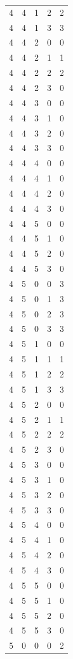 \begin{longtable}{rrrrr}
4 & 4 & 1 & 2 & 2 \\
4 & 4 & 1 & 3 & 3 \\
4 & 4 & 2 & 0 & 0 \\
4 & 4 & 2 & 1 & 1 \\
4 & 4 & 2 & 2 & 2 \\
4 & 4 & 2 & 3 & 0 \\
4 & 4 & 3 & 0 & 0 \\
4 & 4 & 3 & 1 & 0 \\
4 & 4 & 3 & 2 & 0 \\
4 & 4 & 3 & 3 & 0 \\
4 & 4 & 4 & 0 & 0 \\
4 & 4 & 4 & 1 & 0 \\
4 & 4 & 4 & 2 & 0 \\
4 & 4 & 4 & 3 & 0 \\
4 & 4 & 5 & 0 & 0 \\
4 & 4 & 5 & 1 & 0 \\
4 & 4 & 5 & 2 & 0 \\
4 & 4 & 5 & 3 & 0 \\
4 & 5 & 0 & 0 & 3 \\
4 & 5 & 0 & 1 & 3 \\
4 & 5 & 0 & 2 & 3 \\
4 & 5 & 0 & 3 & 3 \\
4 & 5 & 1 & 0 & 0 \\
4 & 5 & 1 & 1 & 1 \\
4 & 5 & 1 & 2 & 2 \\
4 & 5 & 1 & 3 & 3 \\
4 & 5 & 2 & 0 & 0 \\
4 & 5 & 2 & 1 & 1 \\
4 & 5 & 2 & 2 & 2 \\
4 & 5 & 2 & 3 & 0 \\
4 & 5 & 3 & 0 & 0 \\
4 & 5 & 3 & 1 & 0 \\
4 & 5 & 3 & 2 & 0 \\
4 & 5 & 3 & 3 & 0 \\
4 & 5 & 4 & 0 & 0 \\
4 & 5 & 4 & 1 & 0 \\
4 & 5 & 4 & 2 & 0 \\
4 & 5 & 4 & 3 & 0 \\
4 & 5 & 5 & 0 & 0 \\
4 & 5 & 5 & 1 & 0 \\
4 & 5 & 5 & 2 & 0 \\
4 & 5 & 5 & 3 & 0 \\
5 & 0 & 0 & 0 & 2 \\

\end{longtable}
